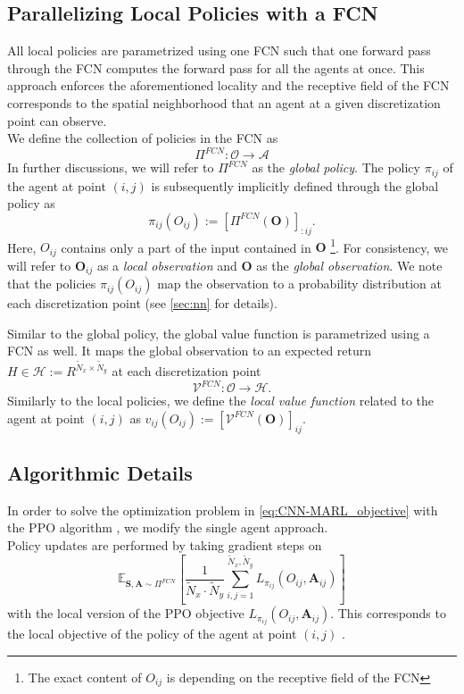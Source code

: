 \documentclass{article}
\theoremstyle{plain}
\theoremstyle{definition}
\theoremstyle{remark}
\begin{document}
\subsection{Parallelizing Local Policies with a FCN}  
All local policies are parametrized using one FCN such that one forward pass through the FCN computes the forward pass for all the agents at once. This approach enforces the aforementioned locality and the receptive field of the FCN corresponds to the spatial neighborhood that an agent at a given discretization point can observe.\\
We define the collection of policies in the FCN as 
\begin{equation}
    \Pi^{FCN}: \mathcal O  \rightarrow \mathcal{A}
\end{equation} 
In further discussions, we will refer to $\Pi^{FCN}$ as the \textit{global policy}. The policy $\pi_{ij}$ of the agent at point $(i,j)$ is subsequently implicitly defined through the global policy as 
\begin{equation}
    \pi_{ij}( O_{ij}) := \left [ \Pi^{FCN} (\boldsymbol O)\right ]_{:ij}.
\end{equation}
Here, $ O_{ij}$ contains only a part of the input contained in $\boldsymbol O$ \footnote{The exact content of $O_{ij}$ is depending on the receptive field of the FCN}. For consistency, we will refer to $\boldsymbol O_{ij}$ as a \textit{local observation} and $\boldsymbol O$ as the \textit{global observation}. We note that the policies $\pi_{ij}(O_{ij})$ map the observation to a probability distribution at each discretization point (see \cref{sec:nn} for details).

Similar to the global policy, the global value function is parametrized using a FCN as well. It maps the global observation to an expected return $H \in  \mathcal{H
} :=R^{ \tilde N_x \times \tilde N_y}$ at each discretization point
\begin{equation}
\mathcal V^{FCN}: \mathcal O \rightarrow \mathcal{H}.
\end{equation}
Similarly to the local policies, we define the \textit{local value function} related to the agent at point $(i,j)$ as $v_{ ij}( O_{ij}) :=  [ \mathcal V^{FCN}(\boldsymbol O) ]_{ij}.$

\subsection{Algorithmic Details} \label{sec:algorithmic_details}
In order to solve the  optimization problem in \cref{eq:CNN-MARL_objective} with the PPO algorithm \cite{ppo}, we modify the single agent approach.\\
Policy updates are performed by taking gradient steps on
\begin{equation}
\mathbb{E}_{\boldsymbol S, \boldsymbol A \sim \Pi^{FCN}} \left[ \frac{1}{\tilde N_x\cdot \tilde N_y} \sum_{i,j=1}^{\tilde N_x, \tilde N_y} L_{\pi_{ij}}(O_{ij},  \boldsymbol{A}_{ij}) \right]
\end{equation}
with the local version of the PPO objective $L_{\pi_{ij}}( O_{ij},  \boldsymbol{A}_{ij})$. This corresponds to the local objective of the policy of the agent at point $(i,j)$ \cite{ppo}.
\end{document}
